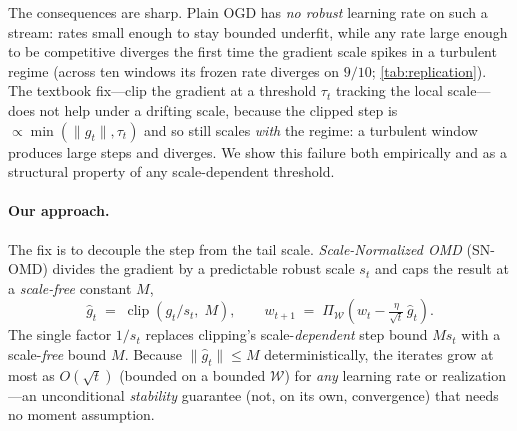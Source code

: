 \documentclass{article}
\newcommand{\norm}[1]{\lVert #1 \rVert}
\newcommand{\gt}{g_t}
\newcommand{\clip}{\operatorname{clip}}
\begin{document}
The consequences are sharp. Plain OGD has \emph{no robust} learning rate on such a
stream: rates small enough to stay bounded underfit, while any rate large enough to be
competitive diverges the first time the gradient scale spikes in a turbulent regime
(across ten windows its frozen rate diverges on $9/10$; \cref{tab:replication}). The textbook fix---clip
the gradient at a threshold $\tau_t$ tracking the local scale---does not help under a
drifting scale, because the clipped step is $\propto\!\min(\norm{\gt},\tau_t)$ and so
still scales \emph{with} the regime: a turbulent window produces large steps and
diverges. We show this failure both empirically and as a structural property of any
scale-dependent threshold.

\paragraph{Our approach.} The fix is to decouple the step from the tail scale.
\emph{Scale-Normalized OMD} (SN-OMD) divides the gradient by a predictable robust
scale $s_t$ and caps the result at a \emph{scale-free} constant $M$,
\[
  \hat{g}_t \;=\; \clip\!\left(\gt/s_t,\; M\right),\qquad
  w_{t+1} \;=\; \Pi_{\mathcal W}\!\left(w_t - \tfrac{\eta}{\sqrt t}\,\hat{g}_t\right).
\]
The single factor $1/s_t$ replaces clipping's scale-\emph{dependent} step bound
$M s_t$ with a scale-\emph{free} bound $M$. Because $\norm{\hat g_t}\le M$
deterministically, the iterates grow at most as $O(\sqrt t)$ (bounded on a bounded
$\mathcal W$) for \emph{any} learning rate or
realization---an unconditional \emph{stability} guarantee (not, on its own,
convergence) that needs no moment assumption.
\end{document}
